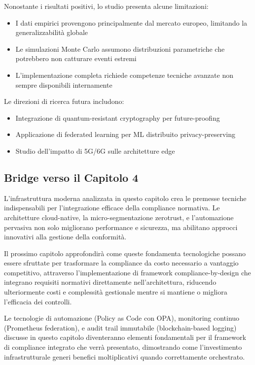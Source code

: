Nonostante i risultati positivi, lo studio presenta alcune limitazioni:

\begin{itemize}
    \item I dati empirici provengono principalmente dal mercato europeo, limitando la generalizzabilità globale
    \item Le simulazioni Monte Carlo assumono distribuzioni parametriche che potrebbero non catturare eventi estremi
    \item L'implementazione completa richiede competenze tecniche avanzate non sempre disponibili internamente
\end{itemize}

Le direzioni di ricerca futura includono:
\begin{itemize}
    \item Integrazione di quantum-resistant cryptography per future-proofing
    \item Applicazione di federated learning per ML distribuito privacy-preserving
    \item Studio dell'impatto di 5G/6G sulle architetture edge
\end{itemize}

\subsection{\texorpdfstring{\textbf{Bridge verso il Capitolo 4}}{3.8.7 - Bridge verso il Capitolo 4}}

L'infrastruttura moderna analizzata in questo capitolo crea le premesse tecniche indispensabili per l'integrazione efficace della compliance normativa. Le architetture cloud-native, la micro-segmentazione \gls{zerotrust}, e l'automazione pervasiva non solo migliorano performance e sicurezza, ma abilitano approcci innovativi alla gestione della conformità.

Il prossimo capitolo approfondirà come queste fondamenta tecnologiche possano essere sfruttate per trasformare la compliance da costo necessario a vantaggio competitivo, attraverso l'implementazione di framework compliance-by-design che integrano requisiti normativi direttamente nell'architettura, riducendo ulteriormente costi e complessità gestionale mentre si mantiene o migliora l'efficacia dei controlli.

Le tecnologie di automazione (Policy as Code con OPA), monitoring continuo (Prometheus federation), e audit trail immutabile (blockchain-based logging) discusse in questo capitolo diventeranno elementi fondamentali per il framework di compliance integrato che verrà presentato, dimostrando come l'investimento infrastrutturale generi benefici moltiplicativi quando correttamente orchestrato.


